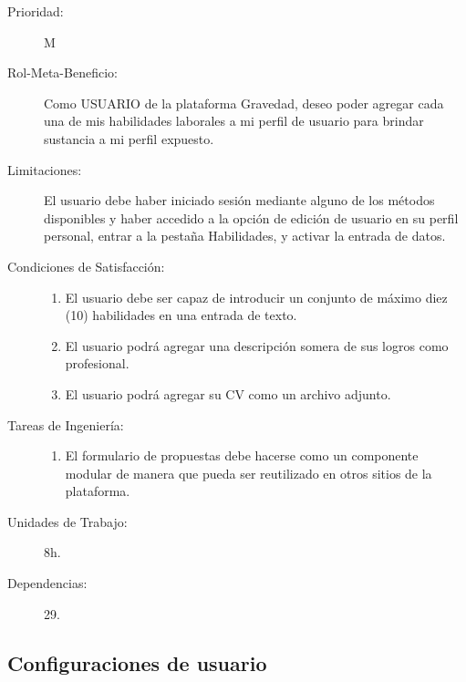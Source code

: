 \begin{description}
    \item[Prioridad:] M
    \item[Rol-Meta-Beneficio:] Como USUARIO de la plataforma Gravedad, deseo poder agregar cada una de mis habilidades laborales a mi perfil de usuario para brindar sustancia a mi perfil expuesto.
    \item[Limitaciones:] El usuario debe haber iniciado sesión mediante alguno de los métodos disponibles y haber accedido a la opción de edición de usuario en su perfil personal, entrar a la pestaña Habilidades, y activar la entrada de datos.
    \item[Condiciones de Satisfacción:]  \hfill
        \begin{enumerate}
            \item El usuario debe ser capaz de introducir un conjunto de máximo diez (10) habilidades en una entrada de texto.
    		\item El usuario podrá agregar una descripción somera de sus logros como profesional.
    		\item El usuario podrá agregar su CV como un archivo adjunto.
        \end{enumerate}
    \item[Tareas de Ingeniería:]  \hfill
        \begin{enumerate}
            \item El formulario de propuestas debe hacerse como un componente modular de manera que pueda ser reutilizado en otros sitios de la plataforma.
        \end{enumerate}
    \item[Unidades de Trabajo:] 8h.
    \item[Dependencias:] 29.
\end{description}

\newpage


\subsection{Configuraciones de usuario}

